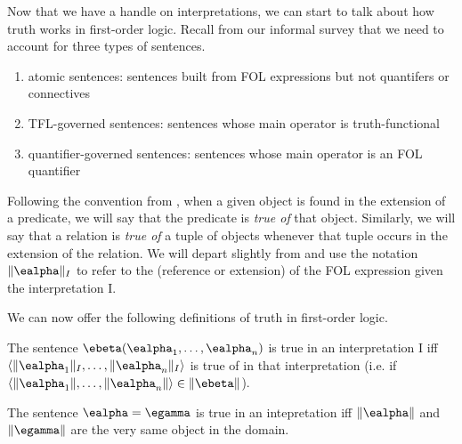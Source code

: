 
Now that we have a handle on interpretations, we can start to talk about how
truth works in first-order logic. Recall from our informal survey that we need
to account for three types of sentences.

\begin{enumerate}
\item atomic sentences: sentences built from FOL expressions but not
  quantifers or connectives
\item TFL-governed sentences: sentences whose main operator is truth-functional
\item quantifier-governed sentences: sentences whose main operator is an FOL
  quantifier
\end{enumerate}

Following the convention from \cite{Mag25}, when a given object is found in the
extension of a predicate, we will say that the predicate is \emph{true of} that
object. Similarly, we will say that a relation is \emph{true of} a tuple of
objects whenever that tuple occurs in the extension of the relation. We will
depart slightly from \cite{Mag25} and use the notation $\|\ealpha\|_I$ to refer
to the (reference or extension) of the FOL expression \ealpha given the
interpretation I.

We can now offer the following definitions of truth in first-order logic.

\begin{definition}
  \label{def:fol-atomic-truth}
  The sentence $\ebeta(\ealpha_1,\dots,\ealpha_n)$ is true in an interpretation
  I iff $\langle\|\ealpha_1\|_I,\dots,\|\ealpha_n\|_I\rangle$ is true of \ebeta
  in that interpretation
  (i.e. if $\langle\|\ealpha_1\|,\dots,\|\ealpha_n\|\rangle\in\|\ebeta\|$).
\end{definition}

\begin{definition}
  \label{def:fol-identity-truth}
  The sentence $\ealpha=\egamma$ is true in an intepretation iff $\|\ealpha\|$
  and $\|\egamma\|$ are the very same object in the domain.
\end{definition}

